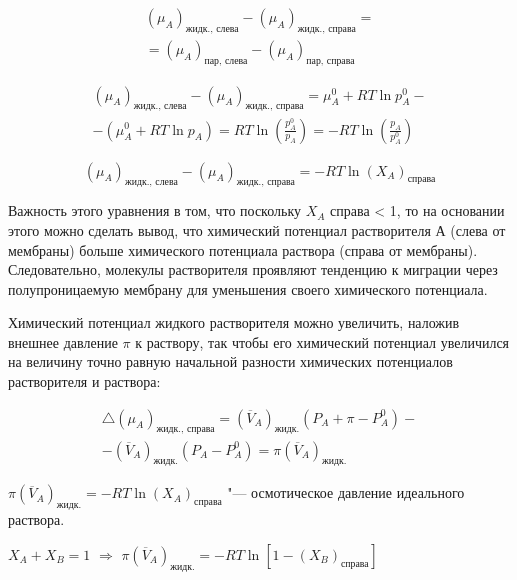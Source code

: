 \documentclass[12pt,a4paper,oneside]{book}
\begin{document}
\begin{equation}
\begin{array}{l} 
	(\mu _ A)_\text {жидк., слева}-(\mu _ A)_\text {жидк., справа}= \\
	=(\mu _ A)_\text {пар, слева}-(\mu _ A)_\text {пар, справа}
\end{array} 
\end{equation}

\begin{equation}
\begin{array}{l} 
	(\mu _ A)_\text {жидк., слева}-(\mu _ A)_\text {жидк., справа}= \mu _A^0 +RT \ln p_A^0 - \\
	- (\mu _A^0 +RT \ln p_A) = RT \ln \left( \frac {p_A^0}{p_A} \right) = -RT \ln \left( \frac {p_A}{p_A^0} \right)
\end{array}
\end{equation}

\begin{equation}
	(\mu _ A)_\text {жидк., слева}-(\mu _ A)_\text {жидк., справа}= -RT \ln \left( X_A \right)_\text {справа}
\end{equation}

Важность этого уравнения в том, что поскольку $X_A$ справа < 1, то на основании этого можно сделать вывод, что химический потенциал растворителя А (слева от мембраны) больше химического потенциала раствора (справа от мембраны). Следовательно, молекулы растворителя проявляют тенденцию к миграции через полупроницаемую мембрану для уменьшения своего химического потенциала.

Химический потенциал жидкого растворителя можно увеличить, наложив внешнее давление $\pi$ к раствору, так чтобы его химический потенциал увеличился на величину точно равную начальной разности химических потенциалов растворителя и раствора:

\begin{equation}
	\begin{array}{l} 
		\bigtriangleup(\mu _A)_\text {жидк., справа} = (\overline{V}_A)_\text {жидк.}(P_A + \pi - P_A^0) - \\
		- (\overline{V}_A)_\text {жидк.}(P_A - P_A^0) = \pi (\overline{V}_A)_\text {жидк.}
	\end{array}
\end{equation}

$\pi (\overline{V}_A)_\text {жидк.} = -RT \ln \left( X_A \right)_\text {справа}$ "--- осмотическое давление идеального раствора.

$X_A+X_B = 1$ $\Rightarrow$ $\pi (\overline{V}_A)_\text {жидк.} = -RT \ln \left[ 1 - (X_B)_\text {справа} \right]$ 
\end{document}
